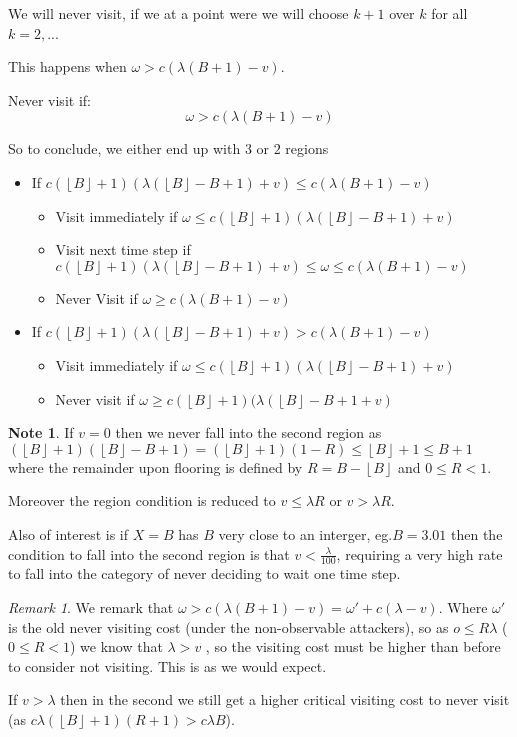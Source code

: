 \documentclass[a4paper,10pt]{article}
\newcommand{\floor}[1]{\left \lfloor #1 \right \rfloor}
\theoremstyle{definition}
\theoremstyle{definition}
\theoremstyle{remark}
\newtheorem*{remark}{Remark}
\theoremstyle{definition}
\newtheorem*{note}{Note}
\begin{document}
We will never visit, if we at a point were we will choose $k+1$ over $k$ for all $k=2,..$.

This happens when $\omega > c(\lambda (B+1) -v)$.

Never visit if:
\begin{equation}
\omega > c(\lambda (B+1) -v)
\end{equation}

So to conclude, we either end up with $3$ or $2$ regions
\begin{itemize}
\item If $c(\floor{B}+1)(\lambda (\floor{B}-B+1) +v) \leq c (\lambda (B+1) - v)$
 \begin{itemize}
 \item Visit immediately if $\omega \leq c (\floor{B}+1) (\lambda (\floor{B}-B+1) +v)$
 \item Visit next time step if $c(\floor{B}+1)(\lambda (\floor{B}-B+1) +v) \leq \omega \leq c (\lambda (B+1) - v)$
 \item Never Visit if $\omega \geq c(\lambda (B+1) -v)$
 \end{itemize}
\item If $c(\floor{B}+1)(\lambda (\floor{B}-B+1) +v) > c (\lambda (B+1) - v)$
 \begin{itemize}
 \item Visit immediately if $\omega \leq c (\floor{B}+1) (\lambda (\floor{B}-B+1) +v)$
 \item Never visit if $\omega \geq c (\floor{B}+1) (\lambda (\floor{B}-B+1+v)$
 \end{itemize}
\end{itemize}

\begin{note}
If $v=0$ then we never fall into the second region as $(\floor{B}+1)(\floor{B}-B+1)=(\floor{B}+1)(1-R) \leq \floor{B}+1 \leq B+1$ where the remainder upon flooring is defined by $R=B-\floor{B}$ and $0 \leq R < 1$.

Moreover the region condition is reduced to $v \leq \lambda R$ or $v > \lambda R$.
\end{note}

Also of interest is if $X=B$ has $B$ very close to an interger, eg.$B=3.01$ then the condition to fall into the second region is that $v < \frac{\lambda}{100}$, requiring a very high rate to fall into the category of never deciding to wait one time step.

\begin{remark}
We remark that $\omega > c (\lambda(B+1)-v )=\omega' + c(\lambda -v)$. Where $\omega'$ is the old never visiting cost (under the non-observable attackers), so as $o \leq R \lambda$ ($0 \leq R < 1$) we know that $\lambda > v$ , so the visiting cost must be higher than before to consider not visiting. This is as we would expect.

If $v > \lambda$ then in the second we still get a higher critical visiting cost to never visit (as $c \lambda (\floor{B}+1)(R+1) > c \lambda B$).
\end{remark}
\end{document}

